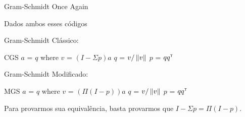 \begin{frame}[fragile]{Gram-Schmidt Once Again}
  \begin{center}
    Dados ambos esses códigos
  \end{center}

  \begin{minipage}[t]{0.45\textwidth}
    Gram-Schmidt Clássico:
    \vspace{0.2cm}
    \begin{code}
CGS $a$ = $q$
    where
        $v$ = $(I - \Sigma p) a$
        $q$ = $v / \left\lVert v\right\rVert$
        $p$ = $qq^{\scriptscriptstyle\mathsf{T}\mkern-1mu}$
    \end{code}
  \end{minipage}
  \hfill
  \vrule
  \hfill
  \begin{minipage}[t]{0.50\textwidth}
    Gram-Schmidt Modificado:
    \vspace{0.2cm}
    \begin{code}
MGS $a$ = $q$
    where
        $v$ = $(\Pi (I - p)) a$
        $q$ = $v / \left\lVert v\right\rVert$
        $p$ = $qq^{\scriptscriptstyle\mathsf{T}\mkern-1mu}$
    \end{code}
  \end{minipage}
  \vfill
  \pause
  \begin{center}
    Para provarmos sua equivalência, basta provarmos que $I - \Sigma p = \Pi (I - p)$.
  \end{center}
\end{frame}